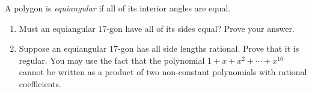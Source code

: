 A polygon is \emph{equiangular} if all of its interior angles are equal.
\begin{enumerate}
\item[(a)] Must an equiangular $17$-gon have all of its sides equal? Prove your answer.
\item[(b)] Suppose an equiangular $17$-gon has all side lengths rational. Prove that it is regular. You may use the fact that the polynomial $1+x+x^2+\cdots+x^{16}$ cannot be written as a product of two non-constant polynomials with rational coefficients.
\end{enumerate}
